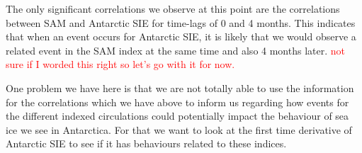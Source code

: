 The only significant correlations we observe at this point are the correlations between SAM and Antarctic SIE for time-lags of 0 and 4 months. This indicates that when an event occurs for Antarctic SIE, it is likely that we would observe a related event in the SAM index at the same time and also 4 months later. \textcolor{red}{not sure if I worded this right so let's go with it for now.}\medskip

One problem we have here is that we are not totally able to use the information for the correlations which we have above to inform us regarding how events for the different indexed circulations could potentially impact the behaviour of sea ice we see in Antarctica. For that we want to look at the first time derivative of Antarctic SIE to see if it has behaviours related to these indices.